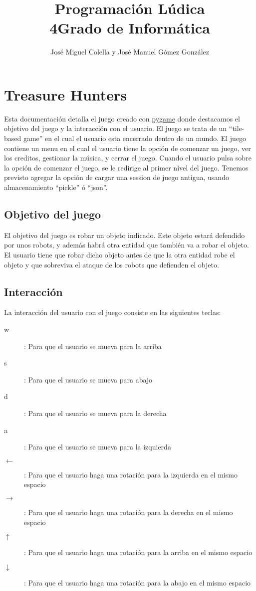 \documentclass{article}
\title{Programación Lúdica\\4\degree Grado de Informática}
\author{José Miguel Colella y José Manuel Gómez González}
\begin{document}
\maketitle

\section{Treasure Hunters}
\label{sec:title}

Esta documentación detalla el juego creado con \href{pygame.org}{pygame} donde
destacamos el objetivo del juego y la interacción con el usuario. El juego se trata de un ``tile-based game'' en el cual el usuario esta encerrado dentro de un mundo. El juego contiene un menu en el cual el usuario tiene la opción de comenzar un juego, ver los creditos, gestionar la música, y cerrar el juego.
Cuando el usuario pulsa sobre la opción de comenzar el juego, se le redirige al primer nível del juego. Tenemos previsto agregar la opción de cargar una session de juego antigua, usando almacenamiento ``pickle'' ó ``json''.

\subsection{Objetivo del juego}

El objetivo del juego es robar un objeto indicado. Este objeto estará defendido por unos robots, y además habrá otra entidad que también va a robar el objeto. El usuario tiene que robar dicho objeto antes de que la otra entidad robe el objeto y que sobreviva el ataque de los robots que defienden el objeto.


\subsection{Interacción}

La interacción del usuario con el juego consiste en las siguientes teclas:
\begin{description}
    \item[w]: Para que el usuario se mueva para la arriba
    \item[s]: Para que el usuario se mueva para abajo
    \item[d]: Para que el usuario se mueva para la derecha
    \item[a]: Para que el usuario se mueva para la izquierda
    \item[$\leftarrow$]: Para que el usuario haga una rotación para la izquierda en el mismo espacio
    \item[$\rightarrow$]: Para que el usuario haga una rotación para la derecha en el mismo espacio
    \item[$\uparrow$]: Para que el usuario haga una rotación para la arriba en el mismo espacio
    \item[$\downarrow$]: Para que el usuario haga una rotación para la abajo en el mismo espacio
\end{description}
\end{document}
